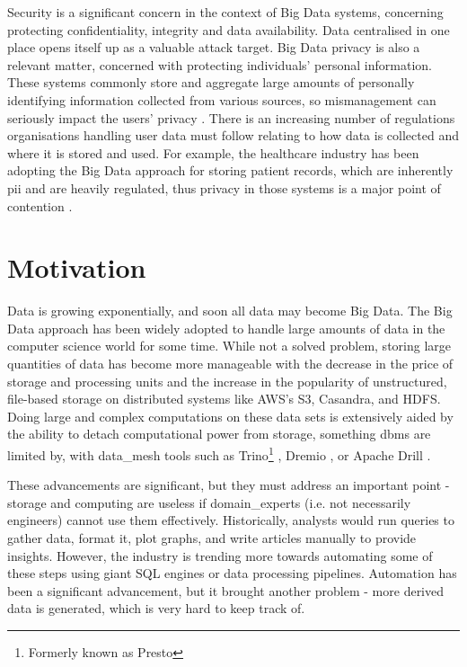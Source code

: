 Security is a significant concern in the context of Big Data systems, concerning protecting confidentiality, integrity and data availability. Data centralised in one place opens itself up as a valuable attack target. Big Data privacy is also a relevant matter, concerned with protecting individuals' personal information. These systems commonly store and aggregate large amounts of personally identifying information collected from various sources, so mismanagement can seriously impact the users' privacy \cite{bigDataSecurityTankard20125}. There is an increasing number of regulations organisations handling user data must follow relating to how data is collected and where it is stored and used. For example, the healthcare industry has been adopting the Big Data approach for storing patient records, which are inherently \acrshort{pii} and are heavily regulated, thus privacy in those systems is a major point of contention \cite{bigDataSecurityHealthPatil2014}.

\section{Motivation}

Data is growing exponentially, and soon all data may become Big Data. The Big Data approach has been widely adopted to handle large amounts of data in the computer science world for some time. While not a solved problem, storing large quantities of data has become more manageable with the decrease in the price of storage and processing units and the increase in the popularity of unstructured, file-based storage on distributed systems like AWS's S3, Casandra, and HDFS. Doing large and complex computations on these data sets is extensively aided by the ability to detach computational power from storage, something \acrshort{dbms} are limited by, with \gls{data_mesh} tools such as Trino\footnote{Formerly known as Presto} \cite{trinoTech, trinoSethi2019}, Dremio \cite{dremioTech}, or Apache Drill \cite{apacheDrillTech, apacheDrillHausenblas2013}.

These advancements are significant, but they must address an important point - storage and computing are useless if \glspl{domain_expert} (i.e. not necessarily engineers) cannot use them effectively. Historically, analysts would run queries to gather data, format it, plot graphs, and write articles manually to provide insights. However, the industry is trending more towards automating some of these steps using giant SQL engines or data processing pipelines. Automation has been a significant advancement, but it brought another problem - more derived data is generated, which is very hard to keep track of.

